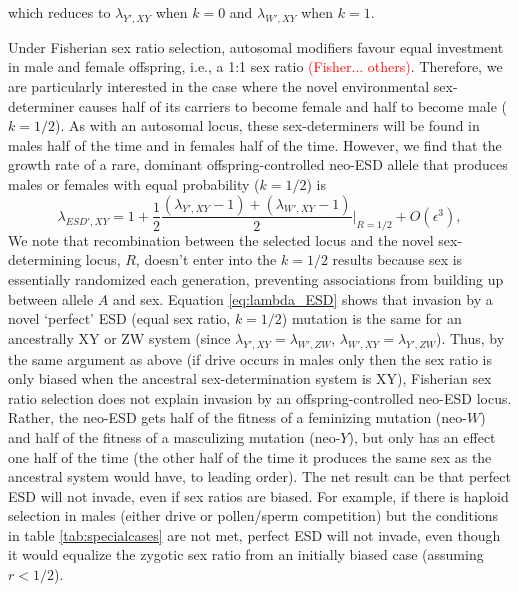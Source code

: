 \documentclass[12pt]{article}
\begin{document}
\noindent
which reduces to $\lambda_{Y',XY}$ when $k=0$ and $\lambda_{W',XY}$ when $k=1$. 

Under Fisherian sex ratio selection, autosomal modifiers favour equal investment in male and female offspring, i.e., a 1:1 sex ratio \textcolor{red}{(Fisher... others)}. 
Therefore, we are particularly interested in the case where the novel environmental sex-determiner causes half of its carriers to become female and half to become male ($k=1/2$). 
As with an autosomal locus, these sex-determiners will be found in males half of the time and in females half of the time.
However, we find that the growth rate of a rare, dominant offspring-controlled neo-ESD allele that produces males or females with equal probability ($k=1/2$) is
\begin{equation}
\lambda_{ESD',XY} =1+ \frac{1}{2}\frac{(\lambda_{Y',XY}-1) + (\lambda_{W',XY}-1)}{2} \Big|_{R=1/2} + O\left(\epsilon^3\right),
\label{eq:lambda_ESD}
\end{equation}
\noindent
We note that recombination between the selected locus and the novel sex-determining locus, $R$, doesn't enter into the $k=1/2$ results because sex is essentially randomized each generation, %
preventing associations from building up between allele $A$ and sex.  
Equation \eqref{eq:lambda_ESD} shows that invasion by a novel `perfect' ESD (equal sex ratio, $k=1/2$) mutation is the same for an ancestrally XY or ZW system (since $\lambda_{Y',XY} = \lambda_{W',ZW}$, $\lambda_{W',XY} = \lambda_{Y',ZW}$).
Thus, by the same argument as above (if drive occurs in males only then the sex ratio is only biased when the ancestral sex-determination system is XY), Fisherian sex ratio selection does not explain invasion by an offspring-controlled neo-ESD locus. 
Rather, the neo-ESD gets half of the fitness of a feminizing mutation (neo-$W$) and half of the fitness of a masculizing mutation (neo-$Y$), but only has an effect one half of the time (the other half of the time it produces the same sex as the ancestral system would have, to leading order). 
The net result can be that perfect ESD will not invade, even if sex ratios are biased. 
For example, if there is haploid selection in males (either drive or pollen/sperm competition) but the conditions in table \ref{tab:specialcases} are not met, perfect ESD will not invade, even though it would equalize the zygotic sex ratio from an initially biased case (assuming $r<1/2$). 
\end{document}
